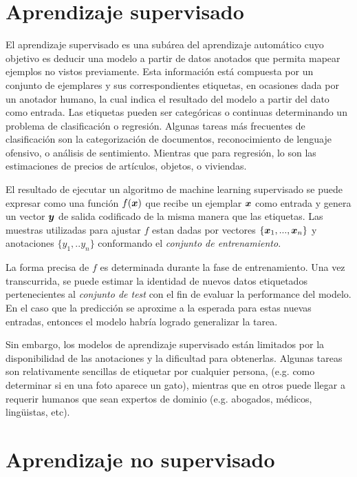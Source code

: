 \section{Aprendizaje supervisado}

El aprendizaje supervisado es una subárea del aprendizaje automático cuyo
objetivo es deducir una modelo a partir de datos anotados que permita mapear
ejemplos no vistos previamente. Esta información está compuesta por un conjunto
de ejemplares y sus correspondientes etiquetas, en ocasiones dada por un
anotador humano, la cual indica el resultado del modelo a partir del dato como
entrada. Las etiquetas pueden ser categóricas o continuas determinando un
problema de clasificación o regresión. Algunas tareas más frecuentes de
clasificación son la categorización de documentos, reconocimiento de lenguaje
ofensivo, o análisis de sentimiento. Mientras que para regresión, lo son las
estimaciones de precios de artículos, objetos, o viviendas.

El resultado de ejecutar un algoritmo de machine learning supervisado se puede
expresar como una función $f(\boldsymbol{x})$ que recibe un ejemplar $\boldsymbol{x}$ como
entrada y genera un vector $\boldsymbol{y}$ de salida codificado de la misma manera
que las etiquetas. Las muestras utilizadas para ajustar $f$ estan dadas por
vectores $\{\boldsymbol{x}_1, ..., \boldsymbol{x}_n\}$ y anotaciones $\{y_1, .. y_n\}$
conformando el \emph{conjunto de entrenamiento}.

La forma precisa de $f$ es determinada durante la fase de entrenamiento. Una vez
transcurrida, se puede estimar la identidad de nuevos datos etiquetados
pertenecientes al \emph{conjunto de test} con el fin de evaluar la performance
del modelo. En el caso que la predicción se aproxime a la esperada para estas
nuevas entradas, entonces el modelo habría logrado generalizar la tarea.

Sin embargo, los modelos de aprendizaje supervisado están limitados por la
disponibilidad de las anotaciones y la dificultad para obtenerlas.
Algunas tareas son relativamente sencillas de etiquetar por cualquier
persona, (e.g. como determinar si en una foto aparece un gato), mientras que en
otros puede llegar a requerir humanos que sean expertos de dominio (e.g.
abogados, médicos, lingüistas, etc).

\section{Aprendizaje no supervisado}

